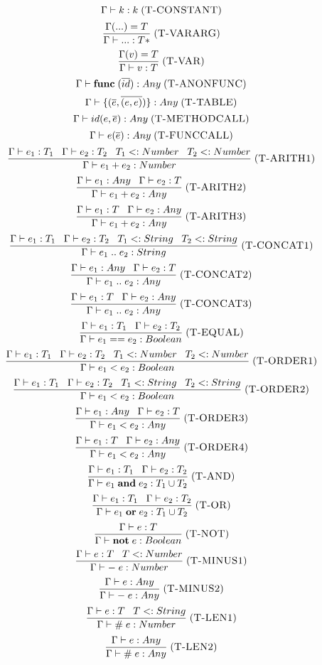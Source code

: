 \documentclass[12pt]{article}
\newcommand{\mylabel}[1]{\; (\textsc{#1})}
\newcommand{\subtype}{<:}
\newcommand{\env}{\Gamma}
\begin{document}
\[
\env \vdash k : k
\mylabel{T-CONSTANT}
\]
\[
\frac{\env({...}) = T}
     {\env \vdash {...} : T*}
\mylabel{T-VARARG}
\]
\[
\frac{\env(v) = T}
     {\env \vdash v : T}
\mylabel{T-VAR}
\]
\[
\env \vdash \mathbf{func} \; (\overline{id}) : Any
\mylabel{T-ANONFUNC}
\]
\[
\env \vdash \{(\overline{e},\overline{(e,e)})\} : Any
\mylabel{T-TABLE}
\]
\[
\env \vdash id(e,\overline{e}) : Any
\mylabel{T-METHODCALL}
\]
\[
\env \vdash e(\overline{e}) : Any
\mylabel{T-FUNCCALL}
\]
\[
\frac{\env \vdash e_{1}:T_{1} \;\;\; \env \vdash e_{2}:T_{2} \;\;\;
      T_{1} \subtype Number \;\;\; T_{2} \subtype Number}
     {\env \vdash e_{1} + e_{2} : Number}
\mylabel{T-ARITH1}
\]
\[
\frac{\env \vdash e_{1}:Any \;\;\; \env \vdash e_{2}:T}
     {\env \vdash e_{1} + e_{2} : Any}
\mylabel{T-ARITH2}
\]
\[
\frac{\env \vdash e_{1}:T \;\;\; \env \vdash e_{2}:Any}
     {\env \vdash e_{1} + e_{2} : Any}
\mylabel{T-ARITH3}
\]
\[
\frac{\env \vdash e_{1}:T_{1} \;\;\; \env \vdash e_{2}:T_{2} \;\;\;
      T_{1} \subtype String \;\;\; T_{2} \subtype String}
     {\env \vdash e_{1} \; {..} \;  e_{2} : String}
\mylabel{T-CONCAT1}
\]
\[
\frac{\env \vdash e_{1}:Any \;\;\; \env \vdash e_{2}:T}
     {\env \vdash e_{1} \; {..} \; e_{2} : Any}
\mylabel{T-CONCAT2}
\]
\[
\frac{\env \vdash e_{1}:T \;\;\; \env \vdash e_{2}:Any}
     {\env \vdash e_{1} \; {..} \; e_{2} : Any}
\mylabel{T-CONCAT3}
\]
\[
\frac{\env \vdash e_{1}:T_{1} \;\;\; \env \vdash e_{2}:T_{2}}
     {\env \vdash e_{1} == e_{2} : Boolean}
\mylabel{T-EQUAL}
\]
\[
\frac{\env \vdash e_{1}:T_{1} \;\;\; \env \vdash e_{2}:T_{2} \;\;\;
      T_{1} \subtype Number \;\;\; T_{2} \subtype Number}
     {\env \vdash e_{1} < e_{2} : Boolean}
\mylabel{T-ORDER1}
\]
\[
\frac{\env \vdash e_{1}:T_{1} \;\;\; \env \vdash e_{2}:T_{2} \;\;\;
      T_{1} \subtype String \;\;\; T_{2} \subtype String}
     {\env \vdash e_{1} < e_{2} : Boolean}
\mylabel{T-ORDER2}
\]
\[
\frac{\env \vdash e_{1}:Any \;\;\; \env \vdash e_{2}:T}
     {\env \vdash e_{1} < e_{2} : Any}
\mylabel{T-ORDER3}
\]
\[
\frac{\env \vdash e_{1}:T \;\;\; \env \vdash e_{2}:Any}
     {\env \vdash e_{1} < e_{2} : Any}
\mylabel{T-ORDER4}
\]
\[
\frac{\env \vdash e_{1}:T_{1} \;\;\; \env \vdash e_{2}:T_{2}}
     {\env \vdash e_{1} \; \mathbf{and} \; e_{2} : T_{1} \cup T_{2}}
\mylabel{T-AND}
\]
\[
\frac{\env \vdash e_{1}:T_{1} \;\;\; \env \vdash e_{2}:T_{2}}
     {\env \vdash e_{1} \; \mathbf{or} \; e_{2} : T_{1} \cup T_{2}}
\mylabel{T-OR}
\]
\[
\frac{\env \vdash e:T}
     {\env \vdash \mathbf{not} \; e : Boolean}
\mylabel{T-NOT}
\]
\[
\frac{\env \vdash e:T \;\;\; T \subtype Number}
     {\env \vdash - \; e : Number}
\mylabel{T-MINUS1}
\]
\[
\frac{\env \vdash e:Any}
     {\env \vdash - \; e : Any}
\mylabel{T-MINUS2}
\]
\[
\frac{\env \vdash e:T \;\;\; T \subtype String}
     {\env \vdash \# \; e : Number}
\mylabel{T-LEN1}
\]
\[
\frac{\env \vdash e:Any}
     {\env \vdash \# \; e : Any}
\mylabel{T-LEN2}
\]
\end{document}
